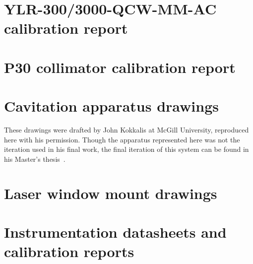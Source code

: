 \documentclass[11pt,a4paper]{report}
\begin{document}
    \clearpage
    \printbibliography[
        heading=bibintoc,
        title={References},
        block=ragged,
        prenote=bibmark
        ]
    \newpage

    \appendix
    \newcommand{\footeronly}{\thispagestyle{fancy}\markboth{}{}}
    \chapter{YLR-300/3000-QCW-MM-AC calibration report}
        \label{chp:app_YLR}
        
    \chapter{P30 collimator calibration report}
        \label{chp:app_Collimator}
        
    \chapter{Cavitation apparatus drawings}
        These drawings were drafted by John Kokkalis at McGill University, reproduced here with his permission. Though the apparatus represented here was not the iteration used in his final work, the final iteration of this system can be found in his Master's thesis~\cite{kokkalisOnsetCavitationDynamically2023}.
        \label{chp:app_CavitatorDrawings}
        
    \chapter{Laser window mount drawings}
        \label{chp:app_lwmDrawings}
        
        
    \chapter{Instrumentation datasheets and calibration reports}
        \label{chp:app_calibration}
        
        
        
\end{document}
